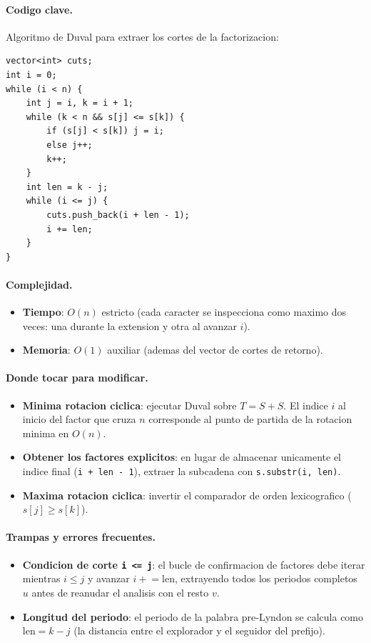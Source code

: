 \paragraph{Codigo clave.}
Algoritmo de Duval para extraer los cortes de la factorizacion:
\begin{verbatim}
vector<int> cuts;
int i = 0;
while (i < n) {
    int j = i, k = i + 1;
    while (k < n && s[j] <= s[k]) {
        if (s[j] < s[k]) j = i;
        else j++;
        k++;
    }
    int len = k - j;
    while (i <= j) {
        cuts.push_back(i + len - 1);
        i += len;
    }
}
\end{verbatim}

\paragraph{Complejidad.}
\begin{itemize}\setlength\itemsep{0pt}
	\item \textbf{Tiempo}: $O(n)$ estricto (cada caracter se inspecciona como maximo dos veces: una durante la extension y otra al avanzar $i$).
	\item \textbf{Memoria}: $O(1)$ auxiliar (ademas del vector de cortes de retorno).
\end{itemize}

\paragraph{Donde tocar para modificar.}
\begin{itemize}\setlength\itemsep{0pt}
	\item \textbf{Minima rotacion ciclica}: ejecutar Duval sobre $T = S + S$. El indice $i$ al inicio del factor que cruza $n$ corresponde al punto de partida de la rotacion minima en $O(n)$.
	\item \textbf{Obtener los factores explicitos}: en lugar de almacenar unicamente el indice final (\verb|i + len - 1|), extraer la subcadena con \verb|s.substr(i, len)|.
	\item \textbf{Maxima rotacion ciclica}: invertir el comparador de orden lexicografico ($s[j] \ge s[k]$).
\end{itemize}

\paragraph{Trampas y errores frecuentes.}
\begin{itemize}\setlength\itemsep{0pt}
	\item \textbf{Condicion de corte \texttt{i <= j}}: el bucle de confirmacion de factores debe iterar mientras $i \le j$ y avanzar $i \mathrel{+}= \text{len}$, extrayendo todos los periodos completos $u$ antes de reanudar el analisis con el resto $v$.
	\item \textbf{Longitud del periodo}: el periodo de la palabra pre-Lyndon se calcula como $\text{len} = k - j$ (la distancia entre el explorador y el seguidor del prefijo).
\end{itemize}

